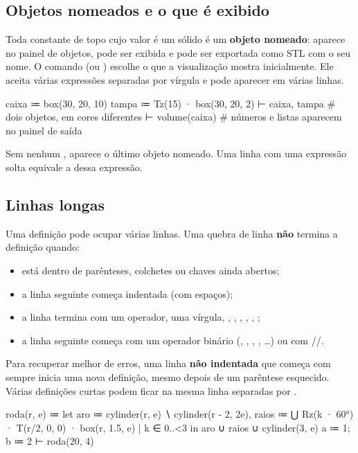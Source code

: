 \subsection{Objetos nomeados e o que é exibido}\label{sec:objetos}
Toda constante de topo cujo valor é um sólido é um \textbf{objeto nomeado}: aparece no painel de objetos, pode ser exibida e
pode ser exportada como STL com o seu nome. O comando  (ou ) escolhe o que a visualização mostra
inicialmente. Ele aceita várias expressões separadas por vírgula e pode aparecer em várias linhas.
\begin{csg}[run]
caixa  ≔ box(30, 20, 10)
tampa  ≔ Tz(15) · box(30, 20, 2)
⊢ caixa, tampa              # dois objetos, em cores diferentes
⊢ volume(caixa)             # números e listas aparecem no painel de saída
\end{csg}
Sem nenhum , aparece o último objeto nomeado. Uma linha com uma expressão solta equivale a  dessa expressão.

\subsection{Linhas longas}\label{sec:linhas}
Uma definição pode ocupar várias linhas. Uma quebra de linha \textbf{não} termina a definição quando:
\begin{itemize}
  \item está dentro de parênteses, colchetes ou chaves ainda abertos;
  \item a linha seguinte começa indentada (com espaços);
  \item a linha termina com um operador, uma vírgula, , , , , , ;
  \item a linha seguinte começa com um operador binário (, , , \code{|>}, …) ou com //.
\end{itemize}
Para recuperar melhor de erros, uma linha \textbf{não indentada} que começa com  sempre inicia uma nova definição,
mesmo depois de um parêntese esquecido. Várias definições curtas podem ficar na mesma linha separadas por \code{;}.
\begin{csg}[run]
roda(r, e) ≔
  let aro ≔ cylinder(r, e) ∖ cylinder(r - 2, 2e),
      raios ≔ ⋃{ Rz(k · 60°) · T(r/2, 0, 0) · box(r, 1.5, e) | k ∈ 0..<3 }
  in aro ∪ raios
     ∪ cylinder(3, e)
a ≔ 1; b ≔ 2
⊢ roda(20, 4)
\end{csg}

